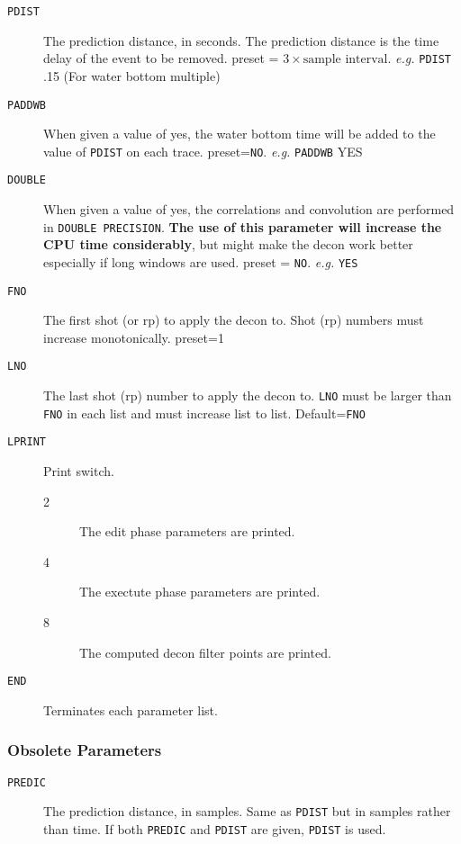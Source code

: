 \begin{description}
     \item[\texttt{PDIST}] The prediction distance, in seconds.  The prediction distance is the time delay of the event to be removed.  \Gls{preset} = $3 \times \mbox{sample interval}$.  \textit{e.g.} \texttt{PDIST} .15 (For water bottom multiple)

     \item[\texttt{PADDWB}] When given a value of yes, the water bottom time will be added to the value of \texttt{PDIST} on each trace.  \Gls{preset}=\texttt{NO}.  \textit{e.g.} \texttt{PADDWB} YES

     \item[\texttt{DOUBLE}] When given a value of yes, the correlations and convolution are performed in \texttt{DOUBLE PRECISION}.  \textbf{The use of this parameter will increase the CPU time considerably}, but might make the decon work better especially if long windows are used.  \Gls{preset} = \texttt{NO}.    \textit{e.g.}  \texttt{YES}

     \item[\texttt{FNO}] The first \gls{shot} (or \gls{rp}) to apply the decon to.  Shot (\gls{rp}) numbers must increase monotonically.  \Gls{preset}=1

     \item[\texttt{LNO}] The last \gls{shot} (\gls{rp}) number to apply the decon to.  \texttt{LNO} must be larger than \texttt{FNO} in each list and must increase list to list.  Default=\texttt{FNO}

     \item[\texttt{LPRINT}] Print switch.
\begin{description}
    \item[2] The edit phase parameters are printed.
    \item[4] The exectute phase parameters are printed.
    \item[8] The computed decon filter points are printed.
\end{description}

   \item[\texttt{END}] Terminates each parameter list.
\end{description}

\subsubsection{Obsolete Parameters}

\begin{description}
\item[\texttt{PREDIC}] The prediction distance, in samples.  Same as \texttt{PDIST} but
         in samples rather than time.  If both \texttt{PREDIC} and \texttt{PDIST} are
         given, \texttt{PDIST} is used.
\end{description}

